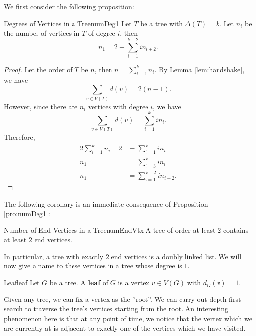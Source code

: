 \documentclass[math]{amznotes}
\theoremstyle{remark}
\newcommand{\0}{\mathbf{0}}
\newcommand{\1}{\mathbf{1}}
\begin{document}
We first consider the following proposition:
\begin{probox}{Degrees of Vertices in a Tree}{numDeg1}
    Let $T$ be a tree with $\Delta(T) = k$. Let $n_i$ be the number of vertices in $T$ of degree $i$, then
    \begin{equation*}
        n_1 = 2 + \sum_{i = 1}^{k - 2}in_{i + 2}.
    \end{equation*}
    \tcblower
    \begin{proof}
        Let the order of $T$ be $n$, then $n = \sum_{i = 1}^{k}n_i$. By Lemma \ref{lem:handshake}, we have
        \begin{equation*}
            \sum_{v \in V(T)}d(v) = 2(n - 1).
        \end{equation*}
        However, since there are $n_i$ vertices with degree $i$, we have
        \begin{equation*}
            \sum_{v \in V(T)}d(v) = \sum_{i = 1}^{k}in_i.
        \end{equation*}
        Therefore,
        \begin{align*}
            2\sum_{i = 1}^{k}n_i - 2 & = \sum_{i = 1}^{k}in_i \\
            n_1 & = \sum_{i = 3}^{k}in_i \\
            n_1 & = \sum_{i = 1}^{k - 2}in_{i + 2}.
        \end{align*}
    \end{proof}
\end{probox}
The following corollary is an immediate consequence of Proposition \ref{pro:numDeg1}:
\begin{corbox}{Number of End Vertices in a Tree}{numEndVtx}
    A tree of order at least $2$ contains at least $2$ end vertices.
\end{corbox}
In particular, a tree with exactly $2$ end vertices is a doubly linked list. We will now give a name to these vertices in a tree whose degree is $1$.
\begin{dfnbox}{Leaf}{leaf}
    Let $G$ be a tree. A {\color{red} \textbf{leaf}} of $G$ is a vertex $v \in V(G)$ with $d_G(v) = 1$.
\end{dfnbox}
Given any tree, we can fix a vertex as the ``root''. We can carry out depth-first search to traverse the tree's vertices starting from the root. An interesting phenomenon here is that at any point of time, we notice that the vertex which we are currently at is adjacent to exactly one of the vertices which we have visited.
\end{document}
